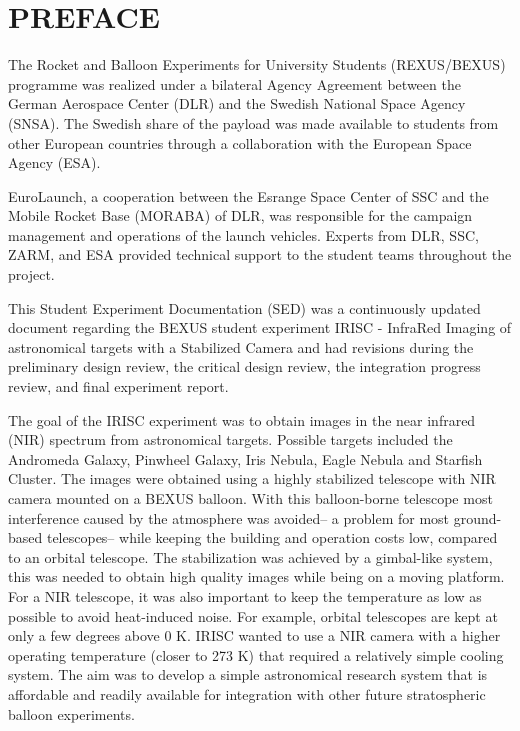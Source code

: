 \section*{PREFACE} \markboth{}{}

The Rocket and Balloon Experiments for University Students (REXUS/BEXUS) programme was realized under a bilateral Agency Agreement between the German Aerospace Center (DLR) and the Swedish National Space Agency (SNSA). The Swedish share of the
payload was made available to students from other European countries through a collaboration with the European Space Agency (ESA).

EuroLaunch, a cooperation between the Esrange Space Center of SSC and the Mobile Rocket Base (MORABA) of DLR, was responsible for the campaign management and operations of the launch vehicles. Experts from DLR, SSC, ZARM, and ESA provided
technical support to the student teams throughout the project.

This Student Experiment Documentation (SED) was a continuously updated document regarding the BEXUS student experiment IRISC - InfraRed Imaging of astronomical targets with a Stabilized Camera and had revisions during the preliminary design review, the critical design review, the integration progress review, and final experiment report.

The goal of the IRISC experiment was to obtain images in the near infrared (NIR) spectrum from astronomical targets. Possible targets included the Andromeda Galaxy, Pinwheel Galaxy, Iris Nebula, Eagle Nebula and Starfish Cluster. The images were obtained using a highly stabilized telescope with NIR camera mounted on a BEXUS balloon. With this balloon-borne telescope most interference caused by the atmosphere was avoided-- a problem for most ground-based telescopes-- while keeping the building and operation costs low, compared to an orbital telescope. The stabilization was achieved by a gimbal-like system, this was needed to obtain high quality images while being on a moving platform. For a NIR telescope, it was also important to keep the temperature as low as possible to avoid heat-induced noise. For example, orbital telescopes are kept at only a few degrees above 0 K. IRISC wanted to use a NIR camera with a higher operating temperature (closer to 273 K) that required a relatively simple cooling system. The aim was to develop a simple astronomical research system that is affordable and readily available for integration with other future stratospheric balloon experiments. 
